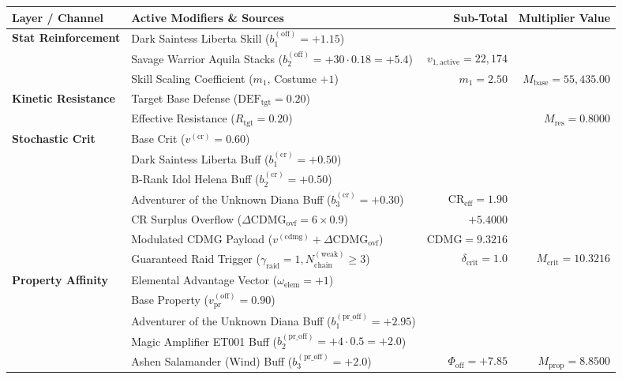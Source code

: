 \documentclass[twocolumn,10pt]{article}
\begin{document}
\begin{table}[H]
\centering
\footnotesize
\setlength{\tabcolsep}{4pt}
\begin{tabular}{llrr}
\toprule
\textbf{Layer / Channel} & \textbf{Active Modifiers \& Sources} & \textbf{Sub-Total} & \textbf{Multiplier Value} \\
\midrule
\textbf{Stat Reinforcement} 
  & Dark Saintess Liberta Skill ($b_1^{(\text{off})} = +1.15$) & & \\
  & Savage Warrior Aquila Stacks ($b_2^{(\text{off})} = +30\cdot 0.18 = +5.4$) & $v_{1,\text{active}} = 22,174$ & \\
  & Skill Scaling Coefficient ($m_1$, Costume $+1$) & $m_1 = 2.50$ & \textbf{$M_{\text{base}} = 55,435.00$} \\
\midrule
\textbf{Kinetic Resistance} 
  & Target Base Defense ($\text{DEF}_{\text{tgt}} = 0.20$) & & \\
  & Effective Resistance ($R_{\text{tgt}} = 0.20$) & & \textbf{$M_{\text{res}} = 0.8000$} \\
\midrule
\textbf{Stochastic Crit} 
  & Base Crit ($v^{(\text{cr})} = 0.60$) & & \\
  & Dark Saintess Liberta Buff ($b^{(\text{cr})}_1 = +0.50$) & & \\
  & B-Rank Idol Helena Buff ($b^{(\text{cr})}_2 = +0.50$) & & \\
  & Adventurer of the Unknown Diana Buff ($b^{(\text{cr})}_3 = +0.30$) & $\text{CR}_{\text{eff}} = 1.90$ & \\
  & CR Surplus Overflow ($\Delta\text{CDMG}_{\text{ovf}} = 6 \times 0.9$) & $+5.4000$ & \\
  & Modulated CDMG Payload ($v^{(\text{cdmg})} + \Delta\text{CDMG}_{\text{ovf}}$) & $\text{CDMG} = 9.3216$ & \\
  & Guaranteed Raid Trigger ($\gamma_{\text{raid}} = 1, N_{\text{chain}}^{(\text{weak})} \ge 3$) & $\delta_{\text{crit}} = 1.0$ & \textbf{$M_{\text{crit}} = 10.3216$} \\ 
\midrule
\textbf{Property Affinity} 
  & Elemental Advantage Vector ($\omega_{\text{elem}} = +1$) & & \\
  & Base Property ($v_{\text{pr}}^{(\text{off})} = 0.90$) & & \\
  & Adventurer of the Unknown Diana Buff ($b_1^{(\text{pr\_off})} = +2.95$) & & \\
  & Magic Amplifier ET001 Buff ($b_2^{(\text{pr\_off})} = +4 \cdot 0.5 = +2.0$) & & \\
  & Ashen Salamander (Wind) Buff ($b_3^{(\text{pr\_off})} = +2.0$) & $\Phi_{\text{off}} = +7.85$ & \textbf{$M_{\text{prop}} = 8.8500$} \\

\end{tabular}
\end{table}
\end{document}
